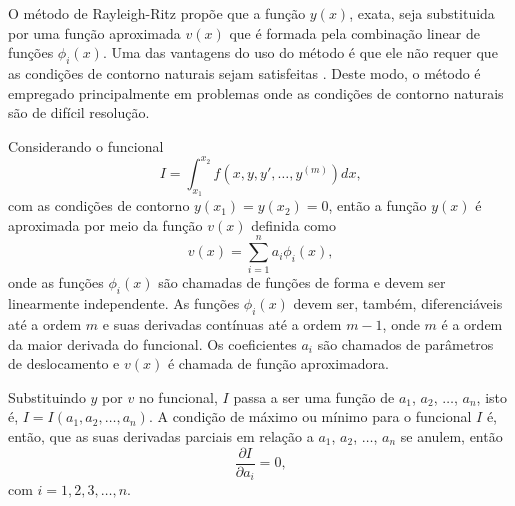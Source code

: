 \documentclass[
	12pt,				%
	openright,			%
    twoside,			%
	a4paper,			%
	english,			%
	french,				%
	spanish,			%
	brazil				%
	]{abntex2}
\numberwithin{lema}{chapter}
\numberwithin{teorema}{chapter}
\numberwithin{definicao}{chapter}
\numberwithin{exemplo}{chapter}
\numberwithin{figure}{chapter}
\begin{document}
O método de Rayleigh-Ritz propõe que a função $y(x)$, exata, seja substituida por uma função aproximada $v(x)$ que é formada pela combinação linear de funções $\phi _i(x)$. Uma das vantagens do uso do método é que ele não requer que as condições de contorno naturais sejam satisfeitas \cite{GROSSI_2001}. Deste modo, o método é empregado principalmente em problemas onde as condições de contorno naturais são de difícil resolução.

Considerando o funcional
$$
	I=\int_{x_1}^{x_2} f(x,y,y',\dots,y^{(m)})dx
	\text{,}
$$
com as condições de contorno $y(x_1)=y(x_2)=0$, então a função $y(x)$ é aproximada por meio da função $v(x)$ definida como
$$
	v(x) = \sum_{i=1}^n a_i \phi _i (x)
	\text{,}
$$
onde as funções $\phi_i(x)$ são chamadas de funções de forma e devem ser linearmente independente. As funções $\phi_i(x)$ devem ser, também, diferenciáveis até a ordem $m$ e suas derivadas contínuas até a ordem $m-1$, onde $m$ é a ordem da maior derivada do funcional. Os coeficientes $a_i$ são chamados de parâmetros de deslocamento e $v(x)$ é chamada de função aproximadora.

Substituindo $y$ por $v$ no funcional, $I$ passa a ser uma função de $a_1$, $a_2$, $\dots$, $a_n$, isto é, $I=I(a_1, a_2, \dots, a_n)$. A condição de máximo ou mínimo para o funcional $I$ é, então, que as suas derivadas parciais em relação a $a_1$, $a_2$, $\dots$, $a_n$ se anulem, então
$$
	\frac{\partial I}{\partial a_i} = 0
	\text{,}
$$
com $i=1, 2, 3, \dots, n$.
\end{document}
